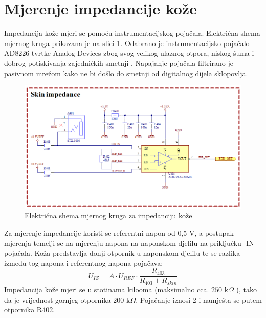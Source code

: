 \section{Mjerenje impedancije kože}
Impedancija kože mjeri se pomoću instrumentacijskog pojačala. Električna shema mjernog kruga prikazana je na slici \ref{slk:EDR}. Odabrano je instrumentacijsko pojačalo AD8226 tvrtke Analog Devices zbog svog velikog ulaznog otpora, niskog šuma i dobrog potiskivanja zajedničkih smetnji \cite{ad:ad8226}. Napajanje pojačala filtrirano je pasivnom mrežom kako ne bi došlo do smetnji od digitalnog dijela sklopovlja.
\begin{figure}[htb]
    \centering
    \includegraphics[width=\textwidth]{Figures/EDR.png}
    \caption{Električna shema mjernog kruga za impedanciju kože}
    \label{slk:EDR}
\end{figure}
Za mjerenje impedancije koristi se referentni napon od 0,5 V, a postupak mjerenja temelji se na mjerenju napona na naponskom djelilu na priključku -IN pojačala. Koža predstavlja donji otpornik u naponskom djelilu te se razlika između tog napona i referentnog napona pojačava:
\begin{equation} \label{eq:EDR}
    U_{IZ}=A\cdot U_{REF}\cdot \frac{R_{403}}{R_{403}+R_{skin}}
\end{equation}
Impedancija kože mjeri se u stotinama kilooma (maksimalno cca. $250\textrm{ k}\Omega$ \cite{rskin}), tako da je vrijednost gornjeg otpornika $200\textrm{ k}\Omega$. Pojačanje iznosi 2 i namješta se putem otpornika R402.

